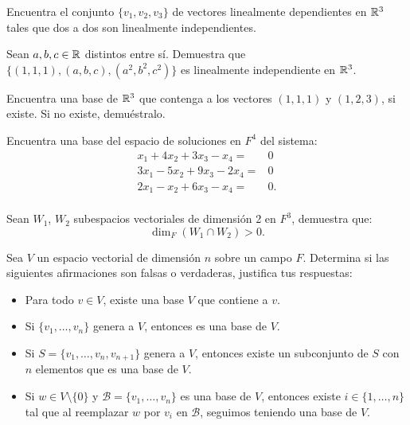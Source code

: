 \documentclass[12pt,a4paper]{book}
\newcommand{\llaves}[1]{\{#1\}}
\begin{document}
    \begin{ejercicio}
        Encuentra el conjunto $\llaves{v_1, v_2, v_3}$ de vectores linealmente dependientes en $\mathbb{R}^3$ tales que dos a dos son linealmente independientes.
    \end{ejercicio}

    \begin{ejercicio}
        Sean $a,b,c \in \mathbb{R}$ distintos entre sí. Demuestra que $\llaves{(1, 1, 1), (a, b, c), (a^2, b^2, c^2)}$ es linealmente independiente en $\mathbb{R}^3$.
    \end{ejercicio}

    \begin{ejercicio}
        Encuentra una base de $\mathbb{R}^3$ que contenga a los vectores $(1, 1, 1)$ y $(1, 2, 3)$, si existe. Si no existe, demuéstralo.
    \end{ejercicio}

    \begin{ejercicio}
        Encuentra una base del espacio de soluciones en $F^4$ del sistema:
        \begin{align*}
            x_1 + 4x_2 + 3x_3 - x_4 = & 0\\
            3x_1 - 5x_2 + 9x_3 - 2x_4 = & 0\\
            2x_1 - x_2 + 6x_3 - x_4 = & 0.\\
        \end{align*}
    \end{ejercicio}

    \begin{ejercicio}
        Sean $W_1$, $W_2$ subespacios vectoriales de dimensión 2 en $F^3$, demuestra que:
        \[
        \dim_F(W_1 \cap W_2) > 0.
        \]
    \end{ejercicio}

    \begin{ejercicio}
        Sea $V$ un espacio vectorial de dimensión $n$ sobre un campo $F$. Determina si las siguientes afirmaciones son falsas o verdaderas, justifica tus respuestas:
        \begin{itemize}
            \item[(a)] Para todo $v \in V$, existe una base $V$ que contiene a $v$.
            \item[(b)] Si $\llaves{v_1, \dots, v_n}$ genera a $V$, entonces es una base de $V$.
            \item[(c)] Si $S = \llaves{v_1, \dots, v_n, v_{n+1}}$ genera a $V$, entonces existe un subconjunto de $S$ con $n$ elementos que es una base de $V$.
            \item[(d)] Si $w \in V \setminus \llaves{0}$ y $\mathcal{B} = \llaves{v_1, \dots, v_n}$ es una base de $V$, entonces existe $i \in \llaves{1, \dots, n}$ tal que al reemplazar $w$ por $v_i$ en $\mathcal{B}$, seguimos teniendo una base de $V$.
        \end{itemize}
    \end{ejercicio}
\end{document}
